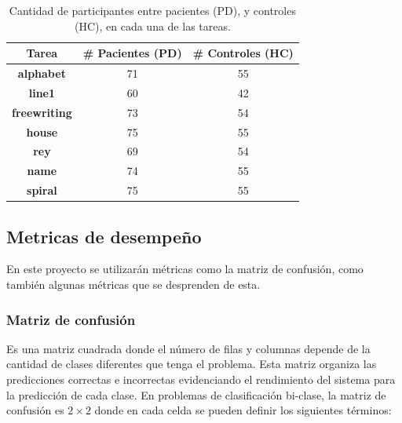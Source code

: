 \documentclass[10pt, a4paper]{article}
\begin{document}
\begin{table}[h!!]
\caption{Cantidad de participantes entre pacientes (PD), y controles (HC), en cada una de las tareas.}
\centering
\label{tab:gita_data}
\begin{tabular}{ccc}
\hline
\textbf{Tarea}       & \textbf{\# Pacientes (PD)} & \textbf{\# Controles (HC)} \\ \hline
\textbf{alphabet}    & 71                         & 55                         \\
\textbf{line1}       & 60                         & 42                         \\
\textbf{freewriting} & 73                         & 54                         \\
\textbf{house}       & 75                         & 55                         \\
\textbf{rey}         & 69                         & 54                         \\
\textbf{name}        & 74                         & 55                         \\
\textbf{spiral}      & 75                         & 55                         \\ \hline
\end{tabular}
\end{table}


\subsection*{Metricas de desempeño}

En este proyecto se utilizarán métricas como la matriz de confusión, como también algunas 
métricas que se desprenden de esta. 

\subsubsection*{Matriz de confusión}

Es una matriz cuadrada donde el número de filas y columnas depende de la cantidad de clases 
diferentes que tenga el problema. Esta matriz organiza las predicciones correctas e incorrectas 
evidenciando el rendimiento del sistema para la predicción de cada clase. En problemas de 
clasificación bi-clase, la matriz de confusión es $2 \times 2$ donde en cada celda se pueden 
definir los siguientes términos:
\end{document}
